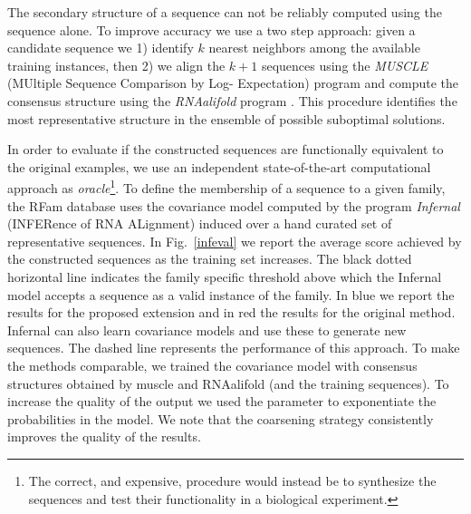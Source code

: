 \documentclass[a4paper]{esannV2}
\begin{document}
The secondary structure of a sequence can not be reliably computed
using the sequence alone.
To improve accuracy
we use a two step approach:
given a candidate sequence we 1) identify $k$ nearest neighbors among the
available training instances, then 2) we align the $k+1$ sequences using the
\emph{MUSCLE} (MUltiple Sequence Comparison by Log- Expectation) program
\citep{muscle} and compute the consensus structure using the \emph{RNAalifold}
program \citep{rnaalifold}. This procedure identifies
the most representative structure in the ensemble of possible suboptimal
solutions.

In order to evaluate if the constructed sequences are functionally equivalent
to the original examples, we use an independent state-of-the-art computational
approach as {\em oracle}\footnote{The correct, and expensive, procedure would
instead be to synthesize the sequences and test their functionality in a
biological experiment.}. To define the membership of a sequence to a given
family, the RFam database uses the covariance model computed by the program
\emph{Infernal} (INFERence of RNA ALignment) \citep{infernal} induced over a
hand curated set of representative sequences.
In Fig.~\ref{infeval} we report the average score achieved by the constructed
sequences as the training set increases.
The black dotted horizontal line indicates
the family specific threshold above which the Infernal model accepts a
sequence as a valid instance of the family. In blue we report the results for
the proposed extension and in red the results for the original method.
Infernal can also learn covariance models and use these to generate new
sequences. The dashed line represents the performance of this approach.
To make the methods comparable, we trained the 
covariance model with consensus structures obtained 
by muscle and RNAalifold (and the training sequences).
To increase the quality of the output we used the parameter
to exponentiate the probabilities in the model.
We note that the coarsening strategy consistently improves the quality of the results. 
\end{document}
